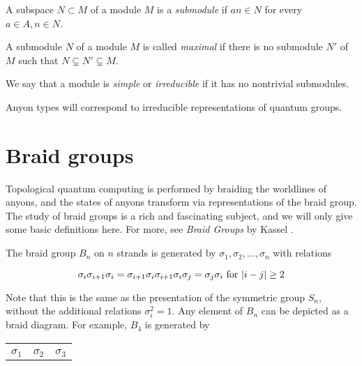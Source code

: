 \begin{defn}
    A subspace $N \subset M$ of a module $M$ is a \emph{submodule} if $an \in
    N$ for every $a \in A, n\in N$.
\end{defn}

\begin{defn}
    A submodule $N$ of a module $M$ is called \emph{maximal} if there is no
    submodule $N'$ of $M$ such that $N \subsetneq N' \subsetneq M$.
\end{defn}

\begin{defn}
    We say that a module is \emph{simple} or \emph{irreducible} if it has no
    nontrivial submodules.
\end{defn}

Anyon types will correspond to irreducible representations of quantum groups.

\section{Braid groups}

Topological quantum computing is performed by braiding the worldlines of
anyons, and the states of anyons transform via representations of the braid
group.  The study of braid groups is a rich and fascinating subject, and we
will only give some basic definitions here. For more, see \emph{Braid Groups}
by Kassel \cite{KasselBraid}.

The braid group $B_n$ on $n$ strands is generated by $\sigma_1, \sigma_2,
    \ldots, \sigma_n$ with relations

\begin{equation}
    \sigma_i \sigma_{i+1} \sigma_i = \sigma_{i+1} \sigma_i \sigma_{i+1} \\
    \sigma_i \sigma_j  = \sigma_j \sigma_i \text{ for $|i-j| \geq 2$}
\end{equation}

Note that this is the same as the presentation of the symmetric group $S_n$,
without the additional relations $\sigma_i^2 = 1$. Any element of $B_n$
can be depicted as a braid diagram. For example, $B_4$ is generated by

\begin{center}
\begin{tabular}{SSS}
&
&
\\
$\sigma_1$ & $\sigma_2$ & $\sigma_3$
\end{tabular}
\end{center}

